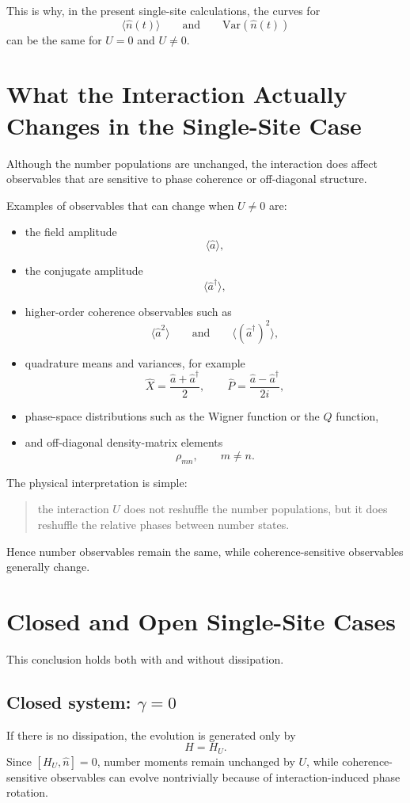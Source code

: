 \documentclass[12pt]{article}
\begin{document}
This is why, in the present single-site calculations, the curves for
\[
\langle \hat n(t) \rangle
\qquad \text{and} \qquad
\mathrm{Var}(\hat n(t))
\]
can be the same for $U=0$ and $U \neq 0$.

\section*{What the Interaction Actually Changes in the Single-Site Case}
Although the number populations are unchanged, the interaction does affect observables that are sensitive to phase coherence or off-diagonal structure.

Examples of observables that can change when $U \neq 0$ are:
\begin{itemize}
\item the field amplitude
\[
\langle \hat a \rangle,
\]
\item the conjugate amplitude
\[
\langle \hat a^\dagger \rangle,
\]
\item higher-order coherence observables such as
\[
\langle \hat a^2 \rangle
\qquad \text{and} \qquad
\langle (\hat a^\dagger)^2 \rangle,
\]
\item quadrature means and variances, for example
\[
\hat X = \frac{\hat a + \hat a^\dagger}{2},
\qquad
\hat P = \frac{\hat a - \hat a^\dagger}{2i},
\]
\item phase-space distributions such as the Wigner function or the $Q$ function,
\item and off-diagonal density-matrix elements
\[
\rho_{mn}, \qquad m \neq n.
\]
\end{itemize}

The physical interpretation is simple:
\begin{quote}
the interaction $U$ does not reshuffle the number populations, but it does reshuffle the relative phases between number states.
\end{quote}
Hence number observables remain the same, while coherence-sensitive observables generally change.

\section*{Closed and Open Single-Site Cases}
This conclusion holds both with and without dissipation.

\subsection*{Closed system: $\gamma = 0$}
If there is no dissipation, the evolution is generated only by
\[
H = H_U.
\]
Since $[H_U,\hat n]=0$, number moments remain unchanged by $U$, while coherence-sensitive observables can evolve nontrivially because of interaction-induced phase rotation.
\end{document}
